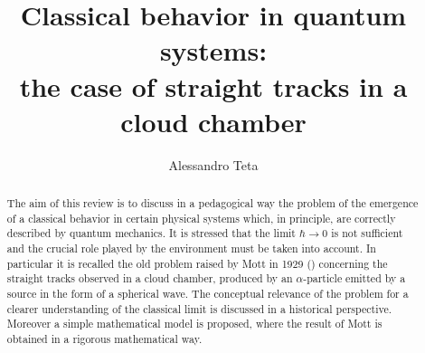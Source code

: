 \documentclass[12pt,reqno]{amsart}
\newcommand{\n}{\relax}
\newcommand{\vs}{\medskip}
\numberwithin{equation}{section}
\begin{document}
\title[ ]{Classical behavior in quantum systems: \\ \vspace{0.1cm} the case of straight tracks in a cloud chamber\\
 \vspace*{0.6cm}}







\author{Alessandro Teta} \address{ A. Teta: Dipartimento di Matematica Pura ed
Applicata,  Universit\`a di L'Aquila}



{\maketitle}

\vs




\begin{abstract}
The aim of this review is to discuss in a pedagogical way the problem of the emergence  of a classical behavior  in certain physical systems which, in principle, are correctly described by quantum mechanics. It is stressed that the  limit  $\hbar \rightarrow 0$ is not sufficient and the crucial role played by the environment must be taken into account. 
In particular it is recalled the old problem raised by Mott in 1929 (\cite{m}) concerning  the straight tracks observed in a cloud chamber, produced by an $\alpha$-particle emitted by a source in the form of a spherical wave. The conceptual  relevance of the problem for a clearer understanding   of the classical limit is discussed in a historical  perspective. Moreover  a simple mathematical model is proposed, where the result of Mott is obtained in a rigorous mathematical way.

 
\end{abstract}
\end{document}
